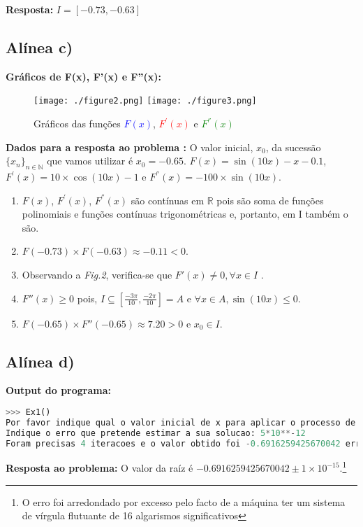 \documentclass{article}
\begin{document}
  \textbf{Resposta: }$I= [-0.73,-0.63]$
\newpage
\begin{flushleft}
\subsection*{Alínea c)}
\end{flushleft}
\textbf{Gráficos de F(x), F'(x) e F''(x):}
\begin{figure}[H]
\begin{center}
\texttt{[image: ./figure2.png]}
\texttt{[image: ./figure3.png]}
\caption{Gráficos das funções \textcolor{blue}{$F(x)$}, \textcolor{red}{$F^{'}(x)$} e \textcolor{green}{$F^{''}(x)$}}
\end{center}
\end{figure}
\begin{flushleft}
\textbf{Dados para a resposta ao problema :} O valor inicial, $x_0$, da sucessão $\{x_n\}_{n\in\mathbb{N}}$ que vamos utilizar é $x_0 = -0.65$. $F(x) = \sin(10x)-x-0.1$, $F^{'}(x) = 10\times \cos(10x)-1$ e $F^{''}(x)= -100\times \sin(10x)$.
\end{flushleft}
\begin{enumerate}
  \item $F(x)$, $F^{'}(x)$, $F^{''}(x)$ são contínuas em $\mathbb{R}$ pois são soma de funções polinomiais e funções contínuas trigonométricas e, portanto, em I também o são.
  \item $F(-0.73)\times F(-0.63) \approx-0.11<0 $.
  \item Observando a \textit{Fig.2}, verifica-se que $ F'(x)\neq 0,  \forall x \in I$ .
  \item $ F''(x)\geq 0$ pois, $ I \subseteq [\frac{-3\pi}{10},\frac{-2\pi}{10}]=A$ e $\forall x \in A, \sin(10x)\leq0$.
  \item $ F(-0.65)\times F''(-0.65)\approx 7.20 > 0$ e $x_0 \in I $.
\end{enumerate}
\subsection*{Alínea d)}
\textbf{Output do programa:}
\begin{lstlisting}[language = Python]
>>> Ex1()
Por favor indique qual o valor inicial de x para aplicar o processo de newton: -0.65
Indique o erro que pretende estimar a sua solucao: 5*10**-12
Foram precisas 4 iteracoes e o valor obtido foi -0.6916259425670042 erro absoluto estimado: 3.3306690738754696e-16
\end{lstlisting}
\textbf{Resposta ao problema:} O valor da raíz é $-0.6916259425670042 \pm 1\times10^{-15}$.\footnote{O erro foi arredondado por excesso pelo facto de a máquina ter um sistema de vírgula flutuante de 16 algarismos significativos}
\end{document}
